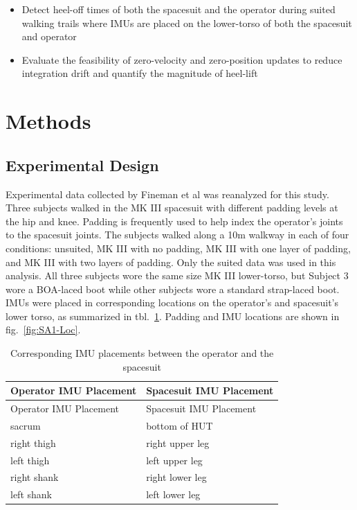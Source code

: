 \documentclass[defaultstyle,11pt]{comps}
\providecommand{\tightlist}{%
  \setlength{\itemsep}{0pt}\setlength{\parskip}{0pt}}
\begin{document}
\begin{itemize}
\tightlist
\item
  Detect heel-off times of both the spacesuit and the operator during suited walking trails where IMUs are placed on the lower-torso of both the spacesuit and operator
\item
  Evaluate the feasibility of zero-velocity and zero-position updates to reduce integration drift and quantify the magnitude of heel-lift
\end{itemize}

\hypertarget{methods}{%
\section{Methods}\label{methods}}

\hypertarget{experimental-design}{%
\subsection{Experimental Design}\label{experimental-design}}

Experimental data collected by Fineman et al \citep{Fineman2018} was reanalyzed for this study.
Three subjects walked in the MK III spacesuit with different padding levels at the hip and knee.
Padding is frequently used to help index the operator's joints to the spacesuit joints.
The subjects walked along a 10m walkway in each of four conditions: unsuited, MK III with no padding, MK III with one layer of padding, and MK III with two layers of padding.
Only the suited data was used in this analysis.
All three subjects wore the same size MK III lower-torso, but Subject 3 wore a BOA-laced boot while other subjects wore a standard strap-laced boot.
IMUs were placed in corresponding locations on the operator's and spacesuit's lower torso, as summarized in tbl.~\ref{tbl:SA1-IMU}.
Padding and IMU locations are shown in fig.~\ref{fig:SA1-Loc}.

\hypertarget{tbl:SA1-IMU}{}
\begin{longtable}[]{@{}ll@{}}
\caption{\label{tbl:SA1-IMU}Corresponding IMU placements between the operator and the spacesuit}\tabularnewline
\toprule
Operator IMU Placement & Spacesuit IMU Placement\tabularnewline
\midrule
\endfirsthead
\toprule
Operator IMU Placement & Spacesuit IMU Placement\tabularnewline
\midrule
\endhead
sacrum & bottom of HUT\tabularnewline
right thigh & right upper leg\tabularnewline
left thigh & left upper leg\tabularnewline
right shank & right lower leg\tabularnewline
left shank & left lower leg\tabularnewline
\bottomrule
\end{longtable}
\end{document}
